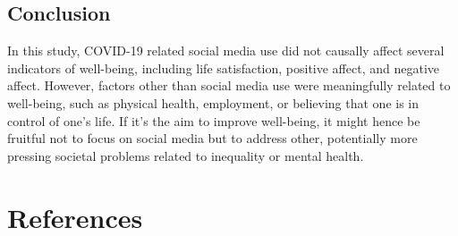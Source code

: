 \documentclass[
  english,
  man,mask,floatsintext]{apa6}
\begin{document}
\hypertarget{conclusion}{%
\subsection{Conclusion}\label{conclusion}}

In this study, COVID-19 related social media use did not causally affect several indicators of well-being, including life satisfaction, positive affect, and negative affect.
However, factors other than social media use were meaningfully related to well-being, such as physical health, employment, or believing that one is in control of one's life.
If it's the aim to improve well-being, it might hence be fruitful not to focus on social media but to address other, potentially more pressing societal problems related to inequality or mental health.

\newpage

\hypertarget{references}{%
\section{References}\label{references}}
\end{document}
